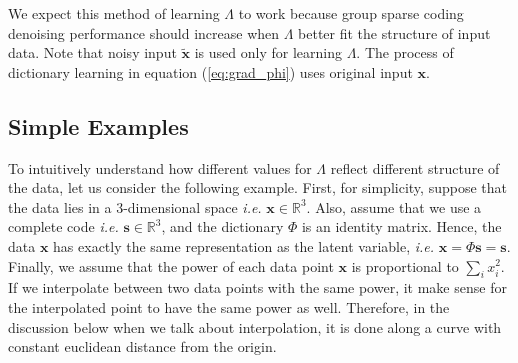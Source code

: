 We expect this method of learning $\Lambda$ to work because group sparse coding denoising performance should increase when $\Lambda$ better fit the structure of input data. Note that noisy input $\tilde{\boldsymbol{x}}$ is used only for learning $\Lambda$. The process of dictionary learning in equation (\ref{eq:grad_phi}) uses original input $\boldsymbol{x}$.

\subsection{Simple Examples}

To intuitively understand how different values for $\Lambda$ reflect different structure of the data, let us consider the following example. First, for simplicity, suppose that the data lies in a 3-dimensional space \textit{i.e.} $\boldsymbol{x} \in \mathbb{R}^3$. Also, assume that we use a complete code \textit{i.e.} $\boldsymbol{s} \in \mathbb{R}^3$, and the dictionary $\Phi$ is an identity matrix. Hence, the data $\boldsymbol{x}$ has exactly the same representation as the latent variable, \textit{i.e.} $\boldsymbol{x} = \Phi\boldsymbol{s} = \boldsymbol{s}$. Finally, we assume that the power of each data point $\boldsymbol{x}$ is proportional to $\sum_i x_i^2$. If we interpolate between two data points with the same power, it make sense for the interpolated point to have the same power as well. Therefore, in the discussion below when we talk about interpolation, it is done along a curve with constant euclidean distance from the origin.

